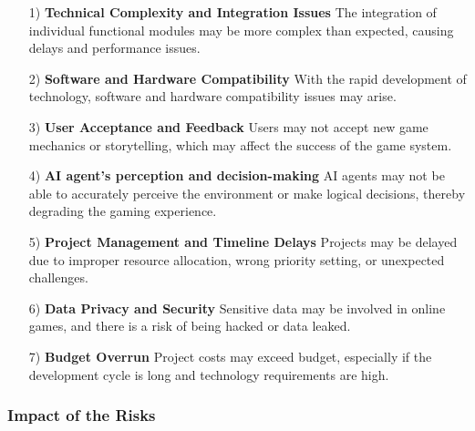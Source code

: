 \begin{itemize}
    \item [1)] 
    \textbf{Technical Complexity and Integration Issues} 
    The integration of individual functional modules may be more complex than expected, causing delays and performance issues.
    \item [2)]
    \textbf{Software and Hardware Compatibility} 
    With the rapid development of technology, software and hardware compatibility issues may arise.
    \item [3)]
    \textbf{User Acceptance and Feedback} 
    Users may not accept new game mechanics or storytelling, which may affect the success of the game system.
    \item [4)]
    \textbf{AI agent’s perception and decision-making} 
    AI agents may not be able to accurately perceive the environment or make logical decisions, thereby degrading the gaming experience.
    \item [5)]
    \textbf{Project Management and Timeline Delays} 
    Projects may be delayed due to improper resource allocation, wrong priority setting, or unexpected challenges.
    \item [6)]
    \textbf{Data Privacy and Security} 
    Sensitive data may be involved in online games, and there is a risk of being hacked or data leaked.
    \item [7)]
    \textbf{Budget Overrun} 
    Project costs may exceed budget, especially if the development cycle is long and technology requirements are high.
\end{itemize}

\subsubsection{Impact of the Risks}

